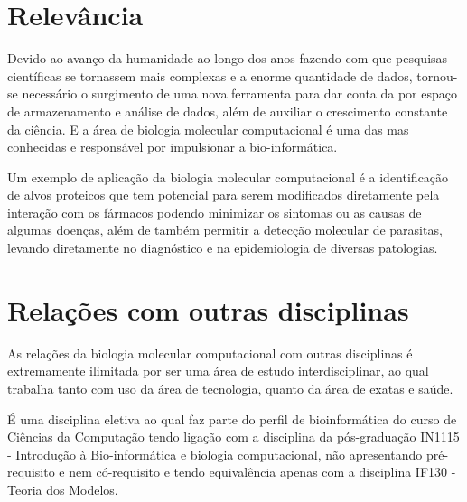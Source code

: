 \documentclass{article}
\begin{document}
\section{Relevância}
\par 
Devido ao avanço da humanidade ao longo dos anos fazendo com que pesquisas científicas se tornassem mais complexas e a enorme quantidade de dados, tornou-se necessário o surgimento de uma nova ferramenta para dar conta da  por espaço de armazenamento e análise de dados, além de auxiliar o crescimento constante da ciência. E a área de biologia molecular computacional é uma das mas conhecidas e responsável por impulsionar a bio-informática.
\par 
Um exemplo de aplicação da biologia molecular computacional é a identificação de alvos proteicos que tem potencial para serem modificados diretamente pela interação com os fármacos podendo minimizar os sintomas ou as causas de algumas doenças, além de também permitir a detecção molecular de parasitas, levando diretamente no diagnóstico e na epidemiologia de diversas patologias\cite{araujo}.
\section{Relações com outras disciplinas}
\par
As relações da biologia molecular computacional com outras disciplinas é extremamente ilimitada por ser uma área de estudo interdisciplinar, ao qual trabalha tanto com uso da área de tecnologia, quanto da área de exatas e saúde\cite{ementa}.
\par
É uma disciplina eletiva ao qual faz parte do perfil de bioinformática do curso de Ciências da Computação tendo ligação com a disciplina da pós-graduação IN1115 - Introdução à Bio-informática e biologia computacional, não apresentando pré-requisito e nem có-requisito e tendo equivalência apenas com a disciplina IF130 - Teoria dos Modelos\cite{ementa}. 

\printbibliography
\end{document}
